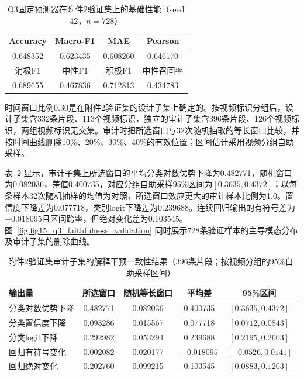 \begin{table}[htbp]
\centering\small
\setlength{\tabcolsep}{6pt}
\caption{Q3固定预测器在附件2验证集上的基础性能（seed 42，$n=728$）}
\label{tab:q3_predictor}
\begin{tabular}{@{}cccc@{}}
\toprule
Accuracy & Macro-F1 & MAE & Pearson\\
\midrule
0.648352 & 0.623435 & 0.608260 & 0.646170\\
\midrule
消极F1 & 中性F1 & 积极F1 & 中性召回率\\
\midrule
0.689655 & 0.467836 & 0.712813 & 0.434783\\
\bottomrule
\end{tabular}
\end{table}

时间窗口比例0.30是在附件2验证集的设计子集上确定的。按视频标识分组后，设计子集含332条片段、113个视频标识，独立的审计子集含396条片段、126个视频标识，两组视频标识无交集。审计时把所选窗口与32次随机抽取的等长窗口比较，并按时间曲线删除10\%、20\%、30\%、40\%的有效位置；区间估计采用视频分组自助采样。

表~\ref{tab:q3_faithfulness} 显示，审计子集上所选窗口的平均分类对数优势下降为0.482771，随机窗口为0.082036，差值0.400735，对应分组自助采样95\%区间为$[0.3635,0.4372]$；以每条样本32次随机抽样的均值为对照，所选窗口效应更大的审计样本比例为1.0。置信度下降差为0.077718，类别logit下降差为0.239688。连续回归输出的有符号差为$-0.018095$且区间跨零，但绝对变化差为0.103545。图~\ref{fig:fig15_q3_faithfulness_validation} 同时展示728条验证样本的主导模态分布及审计子集的删除曲线。

\begin{table}[htbp]
\centering\small
\setlength{\tabcolsep}{4pt}
\caption{附件2验证集审计子集的解释干预一致性结果（396条片段；按视频分组的95\%自助采样区间）}
\label{tab:q3_faithfulness}
\begin{tabular}{@{}lcccc@{}}
\toprule
输出量 & 所选窗口 & 随机等长窗口 & 平均差 & 95\%区间\\
\midrule
分类对数优势下降 & 0.482771 & 0.082036 & 0.400735 & $[0.3635,0.4372]$\\
分类置信度下降 & 0.093286 & 0.015567 & 0.077718 & $[0.0712,0.0843]$\\
分类logit下降 & 0.292982 & 0.053294 & 0.239688 & $[0.2195,0.2603]$\\
回归有符号变化 & 0.002082 & 0.020177 & $-0.018095$ & $[-0.0526,0.0141]$\\
回归绝对变化 & 0.202760 & 0.099215 & 0.103545 & $[0.0883,0.1203]$\\
\bottomrule
\end{tabular}
\end{table}

